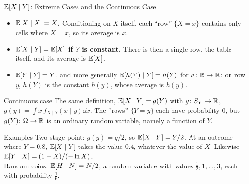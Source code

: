 \begin{frame}{$\mathbb{E}[X\mid Y]$: Extreme Cases and the Continuous Case}
  \small
  \begin{itemize}
    \item \textbf{$\mathbb{E}[X\mid X]=X$.} Conditioning on $X$ itself, each ``row'' $\{X=x\}$ contains only cells where $X=x$, so its average is $x$.
    \item \textbf{$\mathbb{E}[X\mid Y]=\mathbb{E}[X]$ if $Y$ is constant.} There is then a single row, the table itself, and its average is $\mathbb{E}[X]$.
    \item \textbf{$\mathbb{E}[Y\mid Y]=Y$}, and more generally $\mathbb{E}[h(Y)\mid Y]=h(Y)$ for $h\colon\mathbb{R}\to\mathbb{R}$: on row $y$, $h(Y)$ is the constant $h(y)$, whose average is $h(y)$.
  \end{itemize}
  \begin{block}{Continuous case}
    The same definition, $\mathbb{E}[X\mid Y]=g(Y)$ with $g\colon S_Y\to\mathbb{R}$, $g(y)=\int x\,f_{X\mid Y}(x\mid y)\dd x$. The ``rows'' $\{Y=y\}$ each have probability $0$, but $g(Y)\colon\Omega\to\mathbb{R}$ is an ordinary random variable, namely a function of $Y$.
  \end{block}
  \begin{exampleblock}{Examples}
    Two-stage point: $g(y)=y/2$, so $\mathbb{E}[X\mid Y]=Y/2$. At an outcome where $Y=0.8$, $\mathbb{E}[X\mid Y]$ takes the value $0.4$, whatever the value of $X$. Likewise $\mathbb{E}[Y\mid X]=(1-X)/(-\ln X)$.\\
    Random coins: $\mathbb{E}[H\mid N]=N/2$, a random variable with values $\tfrac12,1,\dots,3$, each with probability $\tfrac16$.
  \end{exampleblock}
\end{frame}

